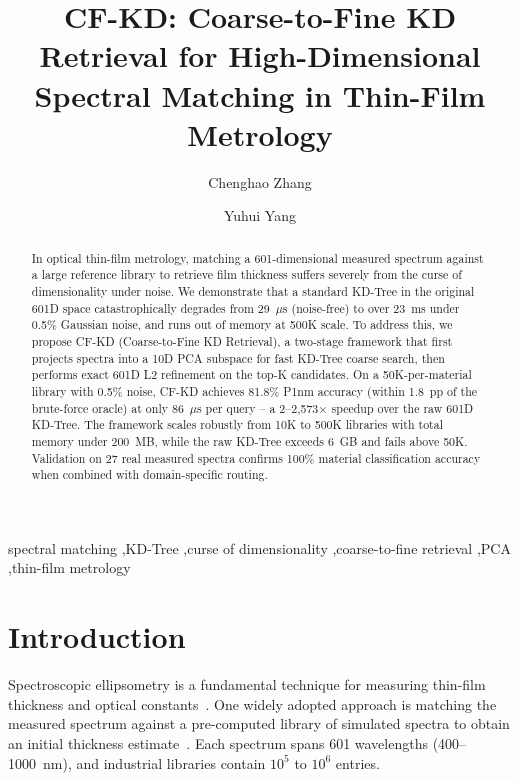 \documentclass[final,5p,times]{elsarticle}
\begin{document}
\begin{frontmatter}
\title{CF-KD: Coarse-to-Fine KD Retrieval for High-Dimensional Spectral Matching in Thin-Film Metrology}

\author[1]{Chenghao Zhang}
\author[1]{Yuhui Yang}
\address[1]{Department of Information Security, Hubei Polytechnic of Emergency Management, Huanggang, China}

\begin{abstract}
In optical thin-film metrology, matching a 601-dimensional measured spectrum against a large reference library to retrieve film thickness suffers severely from the curse of dimensionality under noise. We demonstrate that a standard KD-Tree in the original 601D space catastrophically degrades from 29~$\mu$s (noise-free) to over 23~ms under 0.5\% Gaussian noise, and runs out of memory at 500K scale. To address this, we propose CF-KD (Coarse-to-Fine KD Retrieval), a two-stage framework that first projects spectra into a 10D PCA subspace for fast KD-Tree coarse search, then performs exact 601D L2 refinement on the top-K candidates. On a 50K-per-material library with 0.5\% noise, CF-KD achieves 81.8\% P1nm accuracy (within 1.8~pp of the brute-force oracle) at only 86~$\mu$s per query -- a 2--2,573$\times$ speedup over the raw 601D KD-Tree. The framework scales robustly from 10K to 500K libraries with total memory under 200~MB, while the raw KD-Tree exceeds 6~GB and fails above 50K. Validation on 27 real measured spectra confirms 100\% material classification accuracy when combined with domain-specific routing.
\end{abstract}

\begin{keyword}
spectral matching \sep KD-Tree \sep curse of dimensionality \sep coarse-to-fine retrieval \sep PCA \sep thin-film metrology
\end{keyword}
\end{frontmatter}

\section{Introduction}
\label{sec:intro}

Spectroscopic ellipsometry is a fundamental technique for measuring thin-film thickness and optical constants~\cite{liu2015mueller, chen2014accurate}. One widely adopted approach is matching the measured spectrum against a pre-computed library of simulated spectra to obtain an initial thickness estimate~\cite{zhang2015improved}. Each spectrum spans 601 wavelengths (400--1000~nm), and industrial libraries contain $10^5$ to $10^6$ entries.
\end{document}

